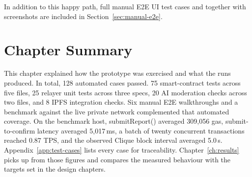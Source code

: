 In addition to this happy path, full manual E2E UI test cases and together with screenshots are included in Section~\ref{sec:manual-e2e}. 


\section{Chapter Summary}
\label{sec:testing-summary}

This chapter explained how the prototype was exercised and what the runs produced. In total, 128 automated cases passed. 75 smart-contract tests across five files, 25 relayer unit tests across three specs, 20 AI moderation checks across two files, and 8 \ac{IPFS} integration checks. Six manual \ac{E2E} walkthroughs and a benchmark against the live private network complemented that automated coverage. On the benchmark host, submitReport() averaged 309{,}056 gas, submit-to-confirm latency averaged 5{,}017\,ms, a batch of twenty concurrent transactions reached 0.87 TPS, and the observed Clique block interval averaged 5.0\,s. Appendix~\ref{app:test-cases} lists every case for traceability. Chapter~\ref{ch:results} picks up from those figures and compares the measured behaviour with the targets set in the design chapters.
